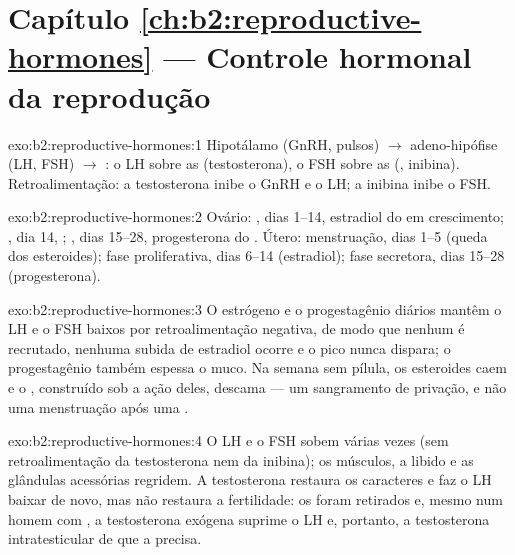 \section*{Capítulo \ref{ch:b2:reproductive-hormones} --- Controle hormonal da reprodução}

\begin{solution}{exo:b2:reproductive-hormones:1}
Hipotálamo (GnRH, pulsos) $\to$ adeno-hipófise (LH, FSH) $\to$
: o LH sobre as  (testosterona), o FSH sobre
as  (, inibina). Retroalimentação: a
testosterona inibe o GnRH e o LH; a inibina inibe o FSH.
\end{solution}

\begin{solution}{exo:b2:reproductive-hormones:2}
Ovário: , dias 1--14, estradiol do  em
crescimento; , dia 14, ; , dias 15--28,
progesterona do . Útero: menstruação, dias 1--5 (queda dos
esteroides); fase proliferativa, dias 6--14 (estradiol); fase
secretora, dias 15--28 (progesterona).
\end{solution}

\begin{solution}{exo:b2:reproductive-hormones:3}
O estrógeno e o progestagênio diários mantêm o LH e o FSH baixos por
retroalimentação negativa, de modo que nenhum  é recrutado,
nenhuma subida de estradiol ocorre e o pico nunca dispara; o
progestagênio também espessa o muco. Na semana sem pílula, os
esteroides caem e o , construído sob a ação deles, descama
--- um sangramento de privação, e não uma menstruação após uma
.
\end{solution}

\begin{solution}{exo:b2:reproductive-hormones:4}
O LH e o FSH sobem várias vezes (sem retroalimentação da testosterona
nem da inibina); os músculos, a libido e as glândulas acessórias
regridem. A testosterona restaura os caracteres e faz o LH baixar de
novo, mas não restaura a fertilidade: os  foram retirados e,
mesmo num homem com , a testosterona exógena suprime o LH e,
portanto, a testosterona intratesticular de que a 
precisa.
\end{solution}

